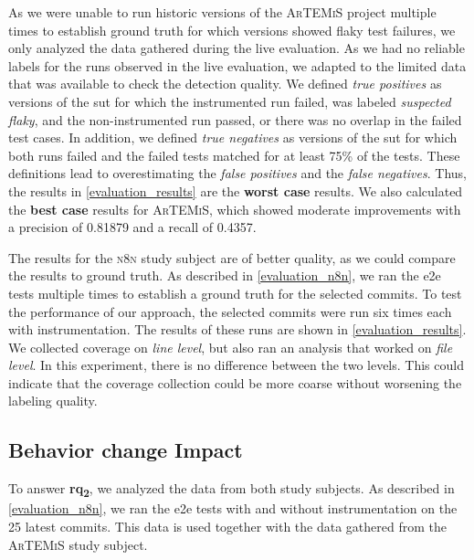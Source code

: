 As we were unable to run historic versions of the \textsc{ArTEMiS} project multiple times to establish ground truth for which versions showed flaky test failures, we only analyzed the data gathered during the live evaluation.
As we had no reliable labels for the runs observed in the live evaluation, we adapted to the limited data that was available to check the detection quality.
We defined \emph{true positives} as versions of the \ac{sut} for which the instrumented run failed, was labeled \emph{suspected flaky}, and the non-instrumented run passed, or there was no overlap in the failed test cases.
In addition, we defined \emph{true negatives} as versions of the \ac{sut} for which both runs failed and the failed tests matched for at least 75\% of the tests.
These definitions lead to overestimating the \emph{false positives} and the \emph{false negatives}.
Thus, the results in \cref{evaluation_results} are the \textbf{worst case} results.
We also calculated the \textbf{best case} results for \textsc{ArTEMiS}, which showed moderate improvements with a precision of \num{0.81879} and a recall of \num{0.4357}.

The results for the \textsc{n8n} study subject are of better quality, as we could compare the results to ground truth.
As described in \cref{evaluation_n8n}, we ran the \ac{e2e} tests multiple times to establish a ground truth for the selected commits.
To test the performance of our approach, the selected commits were run six times each with instrumentation.
The results of these runs are shown in \cref{evaluation_results}.
We collected coverage on \textit{line level}, but also ran an analysis that worked on \textit{file level}.
In this experiment, there is no difference between the two levels.
This could indicate that the coverage collection could be more coarse without worsening the labeling quality.

\subsection{Behavior change Impact}
To answer \textbf{\ac{rq}\textsubscript{2}}, we analyzed the data from both study subjects.
As described in \cref{evaluation_n8n}, we ran the \ac{e2e} tests with and without instrumentation on the 25 latest commits.
This data is used together with the data gathered from the \textsc{ArTEMiS} study subject.

